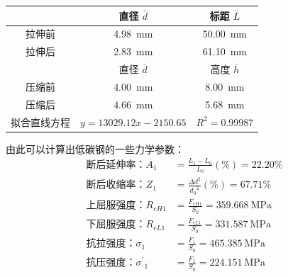 \documentclass[a4paper,utf8]{article}
\begin{document}
        \begin{table}[!ht]
            \centering\begin{tabular}{c c c}\hline
                 \ & 直径 $\bar{d}$ & 标距 $\bar{L}$ \\ \hline
                拉伸前 & \SI{4.98}{\mm} & \SI{50.00}{\mm} \\ 
                拉伸后 & \SI{2.83}{\mm} & \SI{61.10}{\mm} \\ \hline
                \ & 直径 $\bar{d}$ & 高度 $\bar{h}$ \\ \hline
                压缩前 & \SI{4.00}{\mm} & \SI{8.00}{\mm} \\ 
                压缩后 & \SI{4.66}{\mm} & \SI{5.68}{\mm} \\ \hline
                拟合直线方程 & $y=13029.12 x - 2150.65$ & $R^2=0.99987$ \\
            \end{tabular}
        \end{table}\par
        由此可以计算出低碳钢的一些力学参数：
        \begin{align*}
            \text{断后延伸率：} A_1 & = \frac{L_1-L_0}{L_0} (\%) = 22.20 \% \\
            \text{断后收缩率：} Z_1 & = \frac{\Delta d^2}{{d_0}^2} (\%) = 67.71 \% \\
            \text{上屈服强度：} R_{eH1} & = \frac{F_{eH1}}{S_0} = \SI{359.668}{\MPa}\\
            \text{下屈服强度：} R_{eL1} & = \frac{F_{eL1}}{S_0} = \SI{331.587}{\MPa}\\
            \text{抗拉强度：} \sigma_1 & = \frac{F_1}{S_0} = \SI{465.385}{\MPa} \\
            \text{抗压强度：} {\sigma^{'}}_1 & = \frac{F_1}{S_0} = \SI{224.151}{\MPa}\\
        \end{align*}
\end{document}
